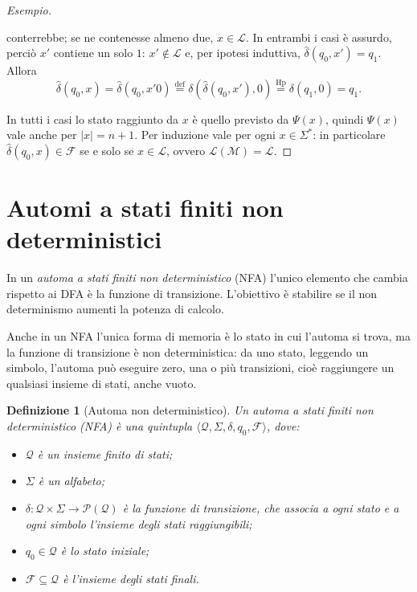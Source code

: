 \documentclass[a4paper, 11pt, oneside]{book}
\theoremstyle{formale}
\newtheorem*{definition}{Definizione}
\newenvironment{esempio}
    {\begin{proof}[\textit{Esempio}]\renewcommand{\qedsymbol}{$\diamond$}}
    {\end{proof}}
\begin{document}
\begin{esempio}
\begin{enumerate}
\begin{enumerate}[label=\arabic{enumi}\alph*.]
                        conterrebbe; se ne contenesse almeno due, $x \in \mathcal{L}$. In
                        entrambi i casi \`e assurdo, perci\`o $x'$ contiene un solo $1$:
                        $x' \notin \mathcal{L}$ e, per ipotesi induttiva,
                        $\hat{\delta}(q_0, x') = q_1$. Allora
                        \begin{equation*}
                            \hat{\delta}(q_0, x) = \hat{\delta}(q_0, x'0)
                            \overset{\text{def}}{=} \delta(\hat{\delta}(q_0, x'), 0)
                            \overset{\text{Hp}}{=} \delta(q_1, 0) = q_1.
                        \end{equation*}
                \end{enumerate}
        \end{enumerate}
        In tutti i casi lo stato raggiunto da $x$ \`e quello previsto da $\Psi(x)$, quindi
        $\Psi(x)$ vale anche per $|x| = n + 1$. Per induzione vale per ogni $x \in \Sigma^*$:
        in particolare $\hat{\delta}(q_0, x) \in \mathcal{F}$ se e solo se $x \in \mathcal{L}$,
        ovvero $\mathcal{L}(\mathcal{M}) = \mathcal{L}$.
    \end{esempio}

    \section{Automi a stati finiti non deterministici}
    In un \emph{automa a stati finiti non deterministico} (NFA) l'unico elemento che
    cambia rispetto ai DFA \`e la funzione di transizione. L'obiettivo \`e stabilire se il
    non determinismo aumenti la potenza di calcolo.

    Anche in un NFA l'unica forma di memoria \`e lo stato in cui l'automa si trova, ma la
    funzione di transizione \`e non deterministica: da uno stato, leggendo un simbolo,
    l'automa pu\`o eseguire zero, una o pi\`u transizioni, cio\`e raggiungere un
    qualsiasi insieme di stati, anche vuoto.

    \begin{definition}[Automa non deterministico]
        Un \emph{automa a stati finiti non deterministico} (NFA) \`e una quintupla
        $\langle \mathcal{Q}, \Sigma, \delta, q_0, \mathcal{F} \rangle$, dove:
        \begin{itemize}
            \item $\mathcal{Q}$ \`e un insieme finito di stati;
            \item $\Sigma$ \`e un alfabeto;
            \item $\delta \colon \mathcal{Q} \times \Sigma \to \mathcal{P}(\mathcal{Q})$ \`e
                la \emph{funzione di transizione}, che associa a ogni stato e a ogni
                simbolo l'insieme degli stati raggiungibili;
            \item $q_0 \in \mathcal{Q}$ \`e lo stato \emph{iniziale};
            \item $\mathcal{F} \subseteq \mathcal{Q}$ \`e l'insieme degli stati
                \emph{finali}.
        \end{itemize}
    \end{definition}
\end{document}
